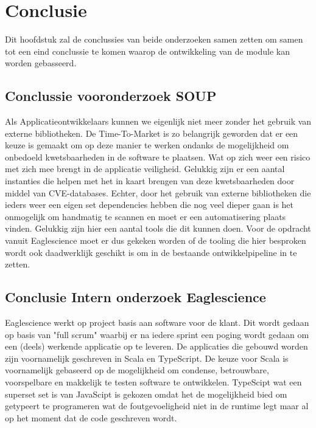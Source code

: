 
\chapter{Conclusie} %

\label{ch:onderzoekConclusie} %

Dit hoofdstuk zal de conclussies van beide onderzoeken samen zetten om samen tot een eind conclussie te komen waarop de ontwikkeling van de module kan worden gebasseerd.


\section{Conclussie vooronderzoek SOUP}\label{sec:conclussie-vooronderzoek-soup}
Als Applicatieontwikkelaars kunnen we eigenlijk niet meer zonder het gebruik van externe bibliotheken.
De Time-To-Market is zo belangrijk geworden dat er een keuze is gemaakt om op deze manier te werken ondanks de mogelijkheid om onbedoeld kwetsbaarheden in de software te plaatsen.
Wat op zich weer een risico met zich mee brengt in de applicatie veiligheid.
Gelukkig zijn er een aantal instanties die helpen met het in kaart brengen van deze kwetsbaarheden door middel van CVE-databases.
Echter, door het gebruik van externe bibliotheken die ieders weer een eigen set dependencies hebben die nog veel dieper gaan is het onmogelijk om handmatig te scannen en moet er een automatisering plaats vinden.
Gelukkig zijn hier een aantal tools die dit kunnen doen.
Voor de opdracht vanuit Eaglescience moet er dus gekeken worden of de tooling die hier besproken wordt ook daadwerklijk geschikt is om in de bestaande ontwikkelpipeline in te zetten.


\section{Conclusie Intern onderzoek Eaglescience}
Eaglescience werkt op project basis aan software voor de klant. Dit wordt gedaan op basis van "full scrum" waarbij er na iedere sprint een poging wordt gedaan om een (deels) werkende applicatie op te leveren. De applicaties die gebouwd worden zijn voornamelijk geschreven in Scala en TypeScript. De keuze voor Scala is voornamelijk gebaseerd op de mogelijkheid om condense, betrouwbare, voorspelbare en makkelijk te testen software te ontwikkelen. TypeScipt wat een superset set is van JavaScipt is gekozen omdat het de mogelijkheid bied om getypeert te programeren wat de foutgevoeligheid niet in de runtime legt maar al op het moment dat de code geschreven wordt.

